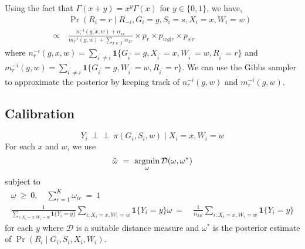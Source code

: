 \documentclass[11pt]{article}
\theoremstyle{plain}
\newcommand{\ind}{\mbox{$\perp\!\!\!\perp$}}
\newcommand{\argmin}{\operatornamewithlimits{argmin}}
\newcommand\spacingset[1]{\renewcommand{\baselinestretch}%
  {#1}\small\normalsize}
\newcommand{\cX}{\mathcal{X}}
\begin{document}
Using the fact that $\Gamma(x+y)=x^y\Gamma(x)$ for $y \in \{0,1\}$, we
have,
\begin{align}
  & \Pr(R_i = r \mid R_{-i}, G_i = g, S_i = s, X_i = x, W_i = w) \\
  \propto \ &
              \frac{n_r^{-i}(g,x,w)+\alpha_{xr}}{m_r^{-i}(g,w)+\sum_{x
              \in \cX}\alpha_{xr}} \times p_r \times p_{wg|r}
              \times p_{s|r}
\end{align}
where
$n_r^{-i}(g,x,w) = \sum_{i^\prime\ne i} \mathbf{1}\{G_{i^\prime} = g,
X_{i^\prime} = x, W_{i^\prime} = w, R_{i^\prime} = r\}$ and
$m_r^{-i}(g,w)=\sum_{i^\prime\ne i} \mathbf{1}\{G_{i^\prime} = g,
W_{i^\prime} = w, R_{i^\prime} = r\}$.  We can use the Gibbs sampler
to approximate the posterior by keeping track of $n_r^{-i}(g,w)$ and
$m_r^{-i}(g,w)$.

\subsection{Calibration}

\begin{equation}
  Y_i \ \ind \ \pi(G_i, S_i, w) \mid X_i = x, W_i = w
\end{equation}
For each $x$ and $w$, we use
\begin{equation}
\hat{\omega} \ = \  \argmin_\omega \mathcal{D}(\omega, \omega^\ast)
\end{equation}
subject to
\begin{align}
  \omega \ \ge \ 0, \quad \sum_{r=1}^K \omega_{ir} \ = \ 1 & \\
  \frac{1}{\sum_{i: X_i = x, W_i =w} \mathbf{1}\{Y_i = y\}} \sum_{i:
  X_i  = x, W_i =w} 
  \mathbf{1}\{Y_i = y\} \omega \ = \ & \frac{1}{n_{xw}} \sum_{i: X_i = x, W_i =w} \mathbf{1}\{Y_i = y\}
\end{align}
for each $y$ where $\mathcal{D}$ is a suitable distance measure and
$\omega^\ast$ is the posterior estimate of
$\Pr(R_i \mid G_i, S_i, X_i, W_i)$.

\spacingset{1.5}

\end{document}
